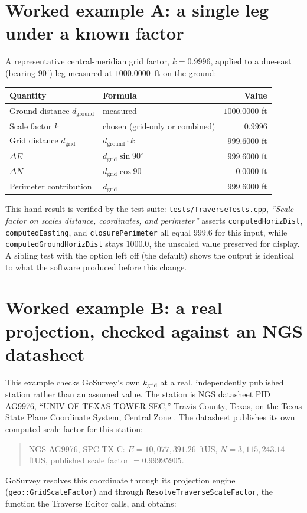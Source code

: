 \documentclass[11pt]{article}
\begin{document}
\section{Worked example A: a single leg under a known factor}
\label{sec:exa}

A representative central-meridian grid factor, $k = 0.9996$, applied to a
due-east (bearing $90^{\circ}$) leg measured at $1000.0000$~ft on the
ground:

\begin{center}
\begin{tabular}{@{}llr@{}}
\toprule
Quantity & Formula & Value \\
\midrule
Ground distance $d_{\mathrm{ground}}$ & measured & $1000.0000$ ft \\
Scale factor $k$ & chosen (grid-only or combined) & $0.9996$ \\
Grid distance $d_{\mathrm{grid}}$ & $d_{\mathrm{ground}} \cdot k$ & $999.6000$ ft \\
$\Delta E$ & $d_{\mathrm{grid}} \sin 90^{\circ}$ & $999.6000$ ft \\
$\Delta N$ & $d_{\mathrm{grid}} \cos 90^{\circ}$ & $0.0000$ ft \\
Perimeter contribution & $d_{\mathrm{grid}}$ & $999.6000$ ft \\
\bottomrule
\end{tabular}
\end{center}

This hand result is verified by the test suite: \texttt{tests/TraverseTests.cpp},
\emph{``Scale factor on scales distance, coordinates, and perimeter''}
asserts \texttt{computedHorizDist}, \texttt{computedEasting}, and
\texttt{closurePerimeter} all equal $999.6$ for this input, while
\texttt{computedGroundHorizDist} stays $1000.0$, the unscaled value
preserved for display. A sibling test with the option left off (the
default) shows the output is identical to what the software produced
before this change.

\section{Worked example B: a real projection, checked against an NGS datasheet}
\label{sec:exb}

This example checks GoSurvey's own $k_{\mathrm{grid}}$ at a real,
independently published station rather than an assumed value. The station
is NGS datasheet PID AG9976, ``UNIV OF TEXAS TOWER SEC,'' Travis County,
Texas, on the Texas State Plane Coordinate System, Central Zone
\citep{ngsAG9976}. The datasheet publishes its own computed scale factor
for this station:
\begin{quote}
NGS AG9976, SPC TX-C: $E = 10{,}077{,}391.26$ ftUS, $N = 3{,}115{,}243.14$
ftUS, published scale factor $= 0.99995905$.
\end{quote}
GoSurvey resolves this coordinate through its projection engine
(\texttt{geo::GridScaleFactor}) and through
\texttt{ResolveTraverseScaleFactor}, the function the Traverse Editor
calls, and obtains:
\end{document}
